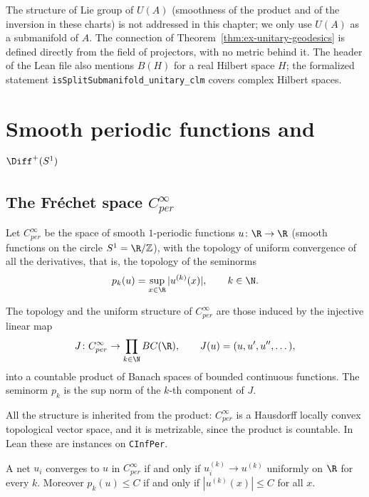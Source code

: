\begin{remark}
  The structure of Lie group of $U(A)$ (smoothness of the product and of the inversion in these
  charts) is not addressed in this chapter; we only use $U(A)$ as a submanifold of $A$. The
  connection of Theorem~\ref{thm:ex-unitary-geodesics} is defined directly from the field of
  projectors, with no metric behind it. The header of the Lean file also mentions $B(H)$ for a
  real Hilbert space $H$; the formalized statement \texttt{isSplitSubmanifold\_unitary\_clm}
  covers complex Hilbert spaces.
\end{remark}

\section{Smooth periodic functions and \texorpdfstring{$\Diff^+(S^1)$}{Diff+(S1)}}

\subsection{The Fréchet space \texorpdfstring{$C^\infty_{per}$}{C-infinity-per}}

Let $C^\infty_{per}$ be the space of smooth $1$-periodic functions $u \colon \R \to \R$ (smooth
functions on the circle $S^1 = \R/\mathbb Z$), with the topology of uniform convergence of all
the derivatives, that is, the topology of the seminorms
\[
  p_k(u) = \sup_{x \in \R} |u^{(k)}(x)|, \qquad k \in \N .
\]

\begin{definition}
  \label{def:ex-cinfper}
  \leanok
  The topology and the uniform structure of $C^\infty_{per}$ are those induced by the injective
  linear map
  \[
    J \colon C^\infty_{per} \to \prod_{k \in \N} BC(\R), \qquad J(u) = (u, u', u'', \dots),
  \]
  into a countable product of Banach spaces of bounded continuous functions. The seminorm $p_k$
  is the sup norm of the $k$-th component of $J$.
\end{definition}

All the structure is inherited from the product: $C^\infty_{per}$ is a Hausdorff locally convex
topological vector space, and it is metrizable, since the product is countable. In Lean these
are instances on \texttt{CInfPer}.

\begin{proposition}
  \label{prop:ex-cinfper-tendsto}
  \leanok
  A net $u_i$ converges to $u$ in $C^\infty_{per}$ if and only if $u_i^{(k)} \to u^{(k)}$
  uniformly on $\R$ for every $k$. Moreover $p_k(u) \le C$ if and only if
  $|u^{(k)}(x)| \le C$ for all $x$.
\end{proposition}

